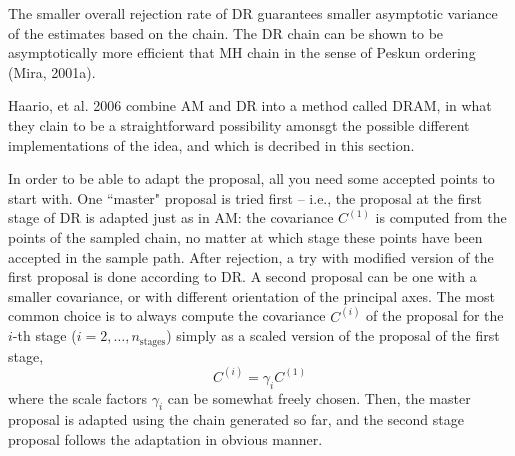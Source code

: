 The smaller overall rejection rate of DR guarantees smaller asymptotic variance of the estimates based on the chain. The DR chain can be shown to be asymptotically more efficient that MH chain in the sense of Peskun ordering (Mira, 2001a). 

% 
% 
% 


Haario, et al. 2006 \cite{HaLaMiSa06} combine AM and DR into a method called DRAM, in what they clain to be a straightforward possibility amonsgt the possible different implementations of the idea, and which is decribed in this section.

In order to be able to adapt the proposal, all you need some accepted points to start with. 
%
One ``master" proposal is tried first -- i.e., the proposal at the first stage of DR is adapted just as in AM: the covariance $C^{(1)}$  is computed from the points of the sampled chain, no matter at which stage these points have been accepted in the sample path. 
After rejection, a try with modified version of the first proposal is done according to DR. A second proposal can be one with a smaller covariance, or with different orientation of the principal axes. The most common choice is to always compute the covariance $C^{(i)}$  of the proposal for the $i$-th stage ($i=2,\ldots, n_\text{stages}$) simply as a scaled version of the proposal of the first stage, $$C^{(i)} = \gamma_i C^{(1)}$$ where the scale factors $\gamma_i$ can be somewhat freely chosen. Then, the master proposal is adapted using the chain generated so far, and the second stage proposal follows the adaptation in obvious manner. %




